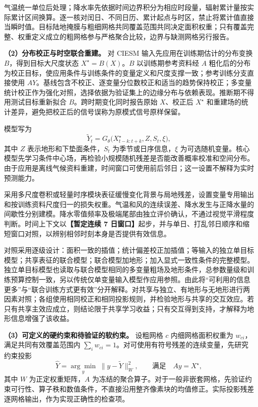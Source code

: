 气温统一单位后处理；降水率先依据时间边界积分为相应时段量，辐射累计量按实际累计区间换算。逐一核对闰日、不同日历、累计起点与时区，禁止将累计值直接当瞬时值。目标陆地掩膜与粗细网格共同覆盖范围共同决定面积权重；只有覆盖完整、权重定义成立的粗网格参与严格聚合比较，边界与缺测网格另行报告。

\textbf{（2）分布校正与时空联合重建。}
对 CIESM 输入先应用在训练期估计的分布变换 $B$，得到目标大尺度状态 $X^{\star}=B(X)$。$B$ 以训练期参考资料经 $A$ 粗化后的分布为校正目标，使应用条件与训练条件的变量定义和尺度支撑一致；参考训练分支直接使用 $AY$。基线包含不校正、逐变量分位数校正和适当的趋势保持校正；多变量统计校正作为强化对照，选择依据为验证集上的边缘分布与依赖表现\cite{Lange2019ISIMIP,Cannon2018MBCn}。推断期不得用测试目标重新拟合 $B$。跨时期变化同时报告原始 $X$、校正后 $X^{\star}$ 和重建场的统计差异，避免把校正后的信号误称为原模式信号原样保留。

模型写为
\begin{equation}
\widetilde{Y}_{t}=G_{\theta}\bigl(X^{\star}_{t-k:t+k},Z,S_t,\xi\bigr),
\end{equation}
其中 $Z$ 表示地形和下垫面条件，$S_t$ 为季节或日序信息，$\xi$ 为可选随机变量。核心模型先学习条件中心场，再检验小规模随机残差是否能改善概率校准和空间分布。由于应用是离线气候资料重建，时间窗口可使用前后邻日；这一设置不解释为实时预测能力。

采用多尺度卷积或轻量时序模块表征缓慢变化背景与局地残差，设置变量专用输出和按训练资料尺度归一的损失权重。气温和风的连续误差、降水发生与正降水量的间歇性分别建模。降水零值频率及极端尾部由独立评价确认，不通过视觉平滑程度判断。时间上下文以\textbf{【暂定连续 7 日窗口】}起步，并与单日、打乱邻日顺序和缩短窗口对照，以辨别相邻时刻本身是否提供有效信息。

对照采用逐级设计：面积一致的插值；统计偏差校正加插值；等输入的独立单目标模型；共享表征的联合模型；联合模型加地形；加入显式一致性条件的完整模型。独立单目标模型也读取与联合模型相同的多变量粗场及地形条件，总参数量级和训练预算控制一致，另以传统仅单变量输入模型作应用参照。由此将“可利用的信息更多”与“联合训练方式更有效”分开解释。对共享与独立、有地形与无地形进行两因素对照；各组使用相同校正和相同投影规则，并检验地形与共享的交互效应。若只有共享主效应成立，则结论限于共享学习收益；只有交互得到支持，才解释为地形信息增强了该收益。

\textbf{（3）可定义的硬约束和待验证的软约束。}
设粗网格 $c$ 内细网格面积权重为 $w_{ci}$，满足共同有效覆盖范围内 $\sum_iw_{ci}=1$。对可使用有符号残差的连续变量，先研究约束投影
\begin{equation}
\widehat{Y}=\underset{y}{\arg\min}\;\|y-\widetilde{Y}\|_{W}^{2},
\qquad \text{满足}\quad Ay=X^{\star},
\end{equation}
其中 $W$ 为正定权重矩阵，$A$ 为冻结的聚合算子。对于一般非嵌套网格，先验证约束可行性、算子秩和数值条件，不直接沿用整齐像素块的均值修正。实际投影残差逐网格输出，作为实现正确性的检查项。

